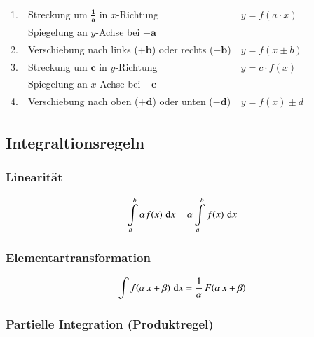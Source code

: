 \begin{tabular}{lll}
    1. & Streckung um $\bm{\frac{1}{a}}$ in $x$-Richtung
       & $y = f(a \cdot x)$                                                               \\
       & Spiegelung an $y$-Achse bei $\bm{-a}$                                            \\
    2. & Verschiebung nach links ($\bm{+b}$) oder rechts ($\bm{-b}$) & $y = f(x \pm b)$   \\
    3. & Streckung um $\bm{c}$ in $y$-Richtung                       & $y = c \cdot f(x)$ \\
       & Spiegelung an $x$-Achse bei $\bm{-c}$
    \\
    4. & Verschiebung nach oben ($\bm{+d}$) oder unten ($\bm{-d}$)   & $y = f(x) \pm d $
\end{tabular}


\subsection{Integraltionsregeln}

\vspace{-0.2cm}

\begin{minipage}[t]{0.4\columnwidth}
    \subsubsection{Linearität}

    \vspace{-0.5cm}

    $$ \int \limits_{a}^{b} \alpha f(x) \, \mathop{} \! \mathrm{d} x = \alpha \int \limits_{a}^{b} f(x) \, \mathop{} \! \mathrm{d} x $$
\end{minipage}
\hfill
\begin{minipage}[t]{0.58\columnwidth}
    \subsubsection{Elementartransformation}

    $$ \int f(\alpha \, x + \beta) \, \mathop{} \! \mathrm{d} x = \frac{1}{\alpha} \, F(\alpha \, x + \beta) $$
\end{minipage}


\subsubsection{Partielle Integration (Produktregel)}
\vspace{-1em}

